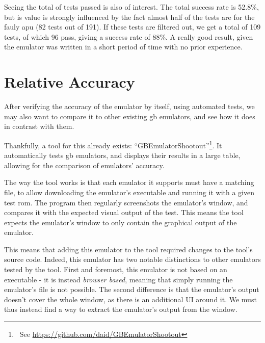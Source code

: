 \documentclass[11pt]{informatics-report}
\newcommand{\ftnt}[1]{\footnote{~See \url{#1}}}
\begin{document}
Seeing the total of tests passed is also of interest. The total success rate is 52.8\%, but is value is strongly influenced by the fact almost half of the tests are for the fauly \gls{apu} (82 tests out of 191). If these tests are filtered out, we get a total of 109 tests, of which 96 pass, giving a success rate of 88\%. A really good result, given the emulator was written in a short period of time with no prior experience.

\section{Relative Accuracy}

After verifying the accuracy of the emulator by itself, using automated tests, we may also want to compare it to other existing \gls{gb} emulators, and see how it does in contrast with them.

Thankfully, a tool for this already exists: ``GBEmulatorShootout''\ftnt{https://github.com/daid/GBEmulatorShootout}. It automatically tests \gls{gb} emulators, and displays their results in a large table, allowing for the comparison of emulators' accuracy. 

The way the tool works is that each emulator it supports must have a matching file, to allow downloading the emulator's executable and running it with a given test \gls{rom}. The program then regularly screenshots the emulator's window, and compares it with the expected visual output of the test. This means the tool expects the emulator's window to only contain the graphical output of the emulator.

This means that adding this emulator to the tool required changes to the tool's source code. Indeed, this emulator has two notable distinctions to other emulators tested by the tool. First and foremost, this emulator is not based on an executable - it is instead \textit{browser based}, meaning that simply running the emulator's file is not possible. The second difference is that the emulator's output doesn't cover the whole window, as there is an additional UI around it. We must thus instead find a way to extract the emulator's output from the window.
\end{document}
